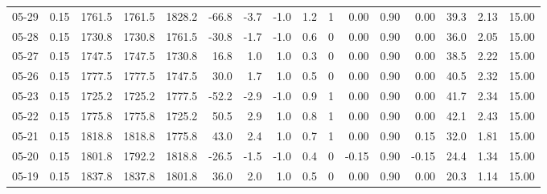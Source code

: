 \begin{threeparttable}
{\begin{tabular}{lrrrrrrrrrrrrrrr}
  05-29 &     0.15 & 1761.5 & 1761.5 & 1828.2 &      -66.8 &           -3.7 &                     -1.0 &                 1.2 &              1 &       0.00 &      0.90 &           0.00 &             39.3 &            2.13 &                  15.00 \\
  05-28 &     0.15 & 1730.8 & 1730.8 & 1761.5 &      -30.8 &           -1.7 &                     -1.0 &                 0.6 &              0 &       0.00 &      0.90 &           0.00 &             36.0 &            2.05 &                  15.00 \\
  05-27 &     0.15 & 1747.5 & 1747.5 & 1730.8 &       16.8 &            1.0 &                      1.0 &                 0.3 &              0 &       0.00 &      0.90 &           0.00 &             38.5 &            2.22 &                  15.00 \\
  05-26 &     0.15 & 1777.5 & 1777.5 & 1747.5 &       30.0 &            1.7 &                      1.0 &                 0.5 &              0 &       0.00 &      0.90 &           0.00 &             40.5 &            2.32 &                  15.00 \\
  05-23 &     0.15 & 1725.2 & 1725.2 & 1777.5 &      -52.2 &           -2.9 &                     -1.0 &                 0.9 &              1 &       0.00 &      0.90 &           0.00 &             41.7 &            2.34 &                  15.00 \\
  05-22 &     0.15 & 1775.8 & 1775.8 & 1725.2 &       50.5 &            2.9 &                      1.0 &                 0.8 &              1 &       0.00 &      0.90 &           0.00 &             42.1 &            2.43 &                  15.00 \\
  05-21 &     0.15 & 1818.8 & 1818.8 & 1775.8 &       43.0 &            2.4 &                      1.0 &                 0.7 &              1 &       0.00 &      0.90 &           0.15 &             32.0 &            1.81 &                  15.00 \\
  05-20 &     0.15 & 1801.8 & 1792.2 & 1818.8 &      -26.5 &           -1.5 &                     -1.0 &                 0.4 &              0 &      -0.15 &      0.90 &          -0.15 &             24.4 &            1.34 &                  15.00 \\
  05-19 &     0.15 & 1837.8 & 1837.8 & 1801.8 &       36.0 &            2.0 &                      1.0 &                 0.5 &              0 &       0.00 &      0.90 &           0.00 &             20.3 &            1.14 &                  15.00 \\

\end{tabular}}
\end{threeparttable}
